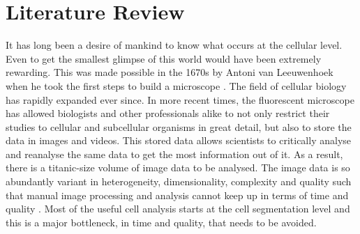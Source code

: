 
\chapter{Literature Review} %

\label{chap:Chapter10} %

It has long been a desire of mankind to know what occurs at the cellular level. Even to get the smallest glimpse of this world would have been extremely rewarding. This was made possible in the 1670s by Antoni van Leeuwenhoek when he took the first steps to build a microscope \cite{Meijering2012}. The field of cellular biology has rapidly expanded ever since.
In more recent times, the fluorescent microscope has allowed biologists and other professionals alike to not only restrict their studies to cellular and subcellular organisms in great detail, but also to store the data in images and videos. This stored data allows scientists to critically analyse and reanalyse the same data to get the most information out of it. As a result, there is a titanic-size volume of image data to be analysed.
The image data is so abundantly variant in heterogeneity, dimensionality, complexity and quality such that manual image processing and analysis cannot keep up in terms of time and quality \cite{Meijering2012}. Most of the useful cell analysis starts at the cell segmentation level and this is a major bottleneck, in time and quality, that needs to be avoided.\\


